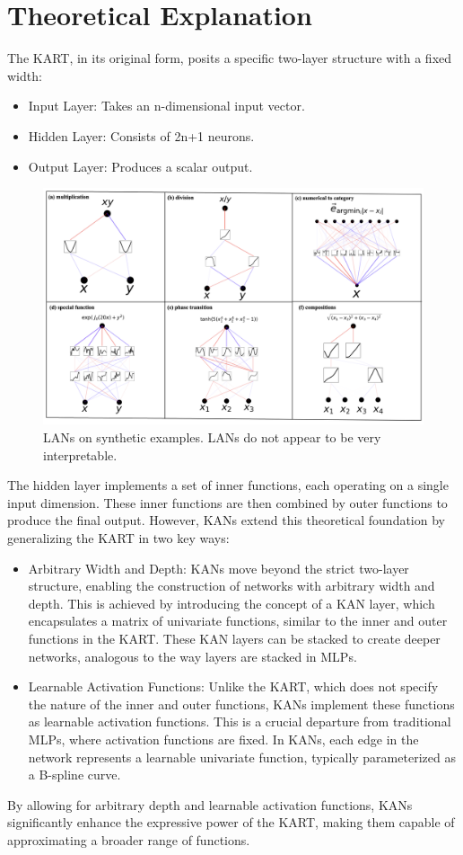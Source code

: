 \section{Theoretical Explanation}

The KART, in its original form, posits a specific two-layer structure with a fixed width:
\begin{itemize}
    \item Input Layer: Takes an n-dimensional input vector.
    \item Hidden Layer: Consists of 2n+1 neurons.
    \item Output Layer: Produces a scalar output.
\end{itemize}

\begin{figure}[t]
    \centering
    \includegraphics[width=0.9\linewidth]{Images/lan_interpretable_examples.png}
    \caption{LANs on synthetic examples. LANs do not appear to be very interpretable.}
    \label{fig:lan-interpretable-examples}
\end{figure}

The hidden layer implements a set of inner functions, each operating on a single input dimension. These inner functions are then combined by outer functions to produce the final output.
However, KANs extend this theoretical foundation by generalizing the KART in two key ways:
\begin{itemize}
    \item Arbitrary Width and Depth: KANs move beyond the strict two-layer structure, enabling the construction of networks with arbitrary width and depth. This is achieved by introducing the concept of a KAN layer, which encapsulates a matrix of univariate functions, similar to the inner and outer functions in the KART. These KAN layers can be stacked to create deeper networks, analogous to the way layers are stacked in MLPs.
    \item Learnable Activation Functions: Unlike the KART, which does not specify the nature of the inner and outer functions, KANs implement these functions as learnable activation functions. This is a crucial departure from traditional MLPs, where activation functions are fixed. In KANs, each edge in the network represents a learnable univariate function, typically parameterized as a B-spline curve.
\end{itemize}

By allowing for arbitrary depth and learnable activation functions, KANs significantly enhance the expressive power of the KART, making them capable of approximating a broader range of functions.